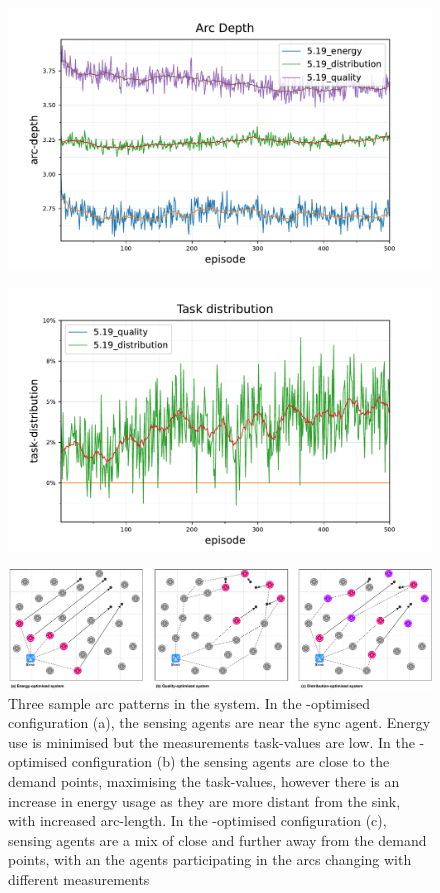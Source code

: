 \begin{figure}
	\centering
	\includegraphics[width=0.7\linewidth]{5.19_ctv-arc-depth-comparison}
	\caption{}
	\label{fig:5}
\end{figure}

\begin{figure}
	\centering
	\includegraphics[width=0.7\linewidth]{5.19c_ctv-task-distribution-baseline-comparison}
	\caption{}
	\label{fig:5}
\end{figure}

\begin{figure}
	\centering
	\includegraphics[width=1.0\linewidth]{result-types}
	\caption{Three sample arc patterns in the \simulationExtended{}{} system. In the \algorithmEnergy{}{}-optimised configuration (a), the sensing agents are near the sync agent. Energy use is minimised but the measurements task-values are low. In the \algorithmQuality{}{}-optimised configuration (b) the sensing agents are close to the demand points, maximising the task-values, however there is an increase in energy usage as they are more distant from the sink, with increased arc-length. In the \algorithmDistribution{}{}-optimised configuration (c), sensing agents are a mix of close and further away from the demand points, with an the agents participating in the arcs changing with different measurements}
	\label{fig:result-types}
\end{figure}

